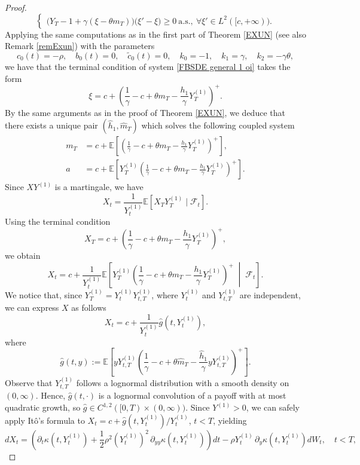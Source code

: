 \documentclass[11pt,a4paper]{article}
\begin{document}
\begin{proof}
\begin{equation}
\begin{cases}
       
        \big(Y_T-1+\gamma(\xi -\theta m_T)\big)\big( \xi'-\xi \big) \geq 0 \ \text{a.s.}, \ \forall \xi' \in L^2([c,+\infty)) .
\end{cases}
\end{equation}
Applying the same computations as in the first part of Theorem \ref{EXUN} (see also Remark \ref{remExun}) with the parameters
\[
c_0(t) = -\rho, \quad b_0(t) = 0, \quad \tilde{c}_0(t) = 0, \quad k_0 = -1, \quad k_1 = \gamma, \quad k_2 =-\gamma\theta,
\]
we have that the terminal condition of system \eqref{FBSDE general 1 oi} takes the form 
\begin{equation}
\label{terminal_X}
\xi=c + \left( \frac{1}{\gamma} - c + \theta m_T - \frac{h_1}{\gamma} Y_T^{(1)} \right)^{+}.
\end{equation}
By the same arguments as in the proof of Theorem \ref{EXUN}, we deduce that there exists a unique  pair $(\hat h_1, \hat m_T)$  which solves the following  coupled system
\begin{align*}
m_T &= c + \mathbb{E} \left[ \left( \frac{1}{\gamma} - c + \theta m_T - \frac{h_1}{\gamma} Y_T^{(1)} \right)^{+} \right], \\
a &= c + \mathbb{E} \left[ Y_T^{(1)} \left( \frac{1}{\gamma} - c + \theta m_T - \frac{h_1}{\gamma} Y_T^{(1)} \right)^{+} \right].
\end{align*}
Since \(X Y^{(1)}\) is a martingale, we have
\[
X_t = \frac{1}{Y_t^{(1)}}
\mathbb{E}\left[ X_T Y_T^{(1)} \mid \mathcal{F}_t \right].
\]
Using the terminal condition
\[X_T=c+\left(\frac{1}{\gamma} - c + \theta m_T-\frac{h_1}{\gamma} Y_T^{(1)}\right)^+,
\]
we obtain
\[
X_t=c+\frac{1}{Y_t^{(1)}}\mathbb{E}\left[Y_T^{(1)}
\left(\frac{1}{\gamma} - c + \theta m_T-\frac{h_1}{\gamma} Y_T^{(1)}\right)^+\;\middle|\;\mathcal{F}_t\right].\]
We notice that, since $Y^{(1)}_T = Y^{(1)}_t Y^{(1)}_{t,T}$, where $Y^{(1)}_t$ and $Y^{(1)}_{t,T}$ are independent, we can express $X$ as follows
\[
X_t = c + \frac{1}{Y^{(1)}_t} \hat g(t, Y^{(1)}_t),
\]
where
\[
\hat g(t,y) := \mathbb{E}\!\left[ yY^{(1)}_{t,T} \left(\frac{1}{\gamma} - c + \theta \hat m_T- \frac{\hat h_1 }{\gamma}yY^{(1)}_{t,T} \right)^+ \right].\]
Observe that $Y^{(1)}_{t,T}$ follows a lognormal distribution with a smooth density on $(0,\infty)$. Hence, $\hat g(t,\cdot)$ is a lognormal convolution of a payoff with at most quadratic growth, so $\hat g \in C^{1,2}([0,T) \times (0, \infty))$. Since $Y^{(1)} > 0$, we can safely apply It\^o's formula to $X_t = c+  \hat g(t,Y^{(1)}_t)/Y^{(1)}_t$, $t<T$, yielding
\[
dX_t = \left(\partial_t \kappa (t,Y^{(1)}_t) + \frac12 \rho^2 (Y_t ^{(1)})^2 \, \partial_{yy} \kappa (t,Y^{(1)}_t) \right)dt - \rho Y^{(1)}_t \, \partial_y \kappa (t,Y^{(1)}_t) dW_t, \quad t<T,
\]
\end{proof}
\end{document}
